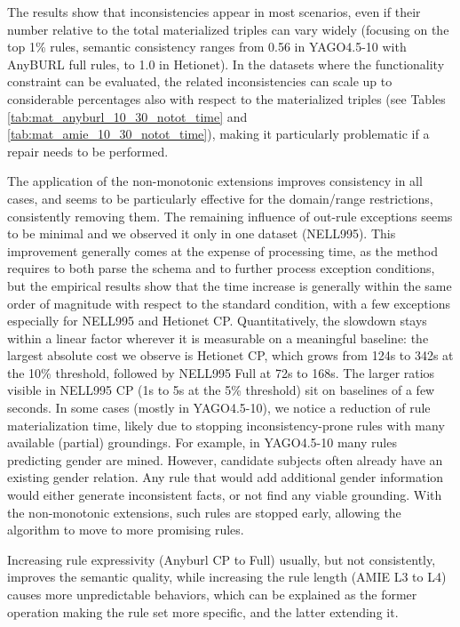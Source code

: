 \documentclass[a4paper,UKenglish,cleveref, autoref, thm-restate]{tgdk-v2021}
\begin{document}
The results show that inconsistencies appear in most scenarios, even if their number relative to the total materialized triples can vary widely (focusing on the top 1\% rules, semantic consistency ranges from 0.56 in YAGO4.5-10 with AnyBURL full rules, to 1.0 in Hetionet). In the datasets where the functionality constraint can be evaluated, the related inconsistencies can scale up to considerable percentages also with respect to the materialized triples (see Tables \ref{tab:mat_anyburl_10_30_notot_time} and \ref{tab:mat_amie_10_30_notot_time}), making it particularly problematic if a repair needs to be performed. 

The application of the non-monotonic extensions improves consistency in all cases, and seems to be particularly effective for the domain/range restrictions, consistently removing them. The remaining influence of out-rule exceptions seems to be minimal and we observed it only in one dataset (NELL995). This improvement generally comes at the expense of processing time, as the method requires to  both parse the schema and to further process exception conditions, but the empirical results show that the time increase is generally within the same order of magnitude with respect to the standard condition, with a few exceptions especially for NELL995 and Hetionet CP. Quantitatively, the slowdown stays within a linear factor wherever it is measurable on a meaningful baseline: the largest absolute cost we observe is Hetionet CP, which grows from 124s to 342s at the 10\% threshold, followed by NELL995 Full at 72s to 168s. The larger ratios visible in NELL995 CP (1s to 5s at the 5\% threshold) sit on baselines of a few seconds. In some cases (mostly in YAGO4.5-10), we notice a reduction of rule materialization time, likely due to stopping inconsistency-prone rules with many available (partial) groundings. For example, in YAGO4.5-10 many rules predicting gender are mined. However, candidate subjects often already have an existing gender relation. Any rule that would add additional gender information would either generate inconsistent facts, or not find any viable grounding. With the non-monotonic extensions, such rules are stopped early, allowing the algorithm to move to more promising rules.

Increasing rule expressivity (Anyburl CP to Full) usually, but not consistently, improves the semantic quality, while increasing the rule length (AMIE L3 to L4) causes more unpredictable behaviors, which can be explained as the former operation making the rule set more specific, and the latter extending it. 
\end{document}
